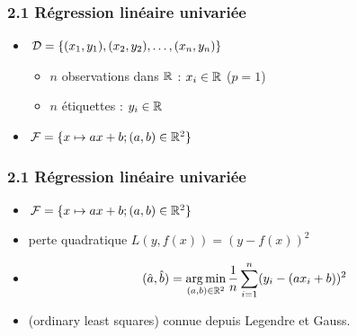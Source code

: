 \begin{frame}
  \frametitle{2.1 Régression linéaire univariée}
  \begin{itemize}
  \item {} $\mathcal{D} = \{(x_1, y_1), (x_2, y_2), \dots, (x_n, y_n)\} $ 
    \begin{itemize}
    \item $n$ observations dans ${\mathbb R}$ : $x_i \in  {\mathbb R}$ ($p=1$)
    \item $n$ étiquettes : $y_i \in {\mathbb R}$
    \end{itemize}
      \begin{overprint}
      \end{overprint}
      \pause
  \item {}  $\mathcal{F} = \{x \mapsto a x + b ; (a, b) \in {\mathbb R}^2\}$ 
  \end{itemize}
\end{frame}

\begin{frame}
  \frametitle{2.1 Régression linéaire univariée}
  \begin{itemize}
  \item {}  $\mathcal{F} = \{x \mapsto a x + b ; (a, b) \in {\mathbb R}^2\}$ 
    \pause
  \item {} perte quadratique $L(y, f(x)) = (y - f(x))^2$
    \pause
  \item {}
    \[ (\hat{a}, \hat{b}) = \operatorname*{arg\,min}_{(a,b) \in {\mathbb R}^2} \frac1n \sum_{i=1}^n (y_i - (a x_i + b))^2 \]
    \pause
  \item[]  \textcolor{gray!70}{(ordinary least squares)} connue depuis Legendre et Gauss. 
  \end{itemize}
\end{frame}

